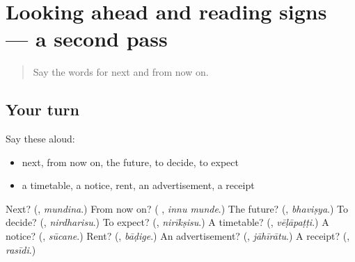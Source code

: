 \section[(dialogue)]{Looking ahead and reading signs — a second pass}

\label{lesson:KA-R157-second-pass-looking-ahead-and-reading-signs}



\begin{quote}
Say the words for next and from now on.
\end{quote}

\subsection*{Your turn}
Say these aloud:

\begin{itemize}
\raggedright
  \item next, from now on, the future, to decide, to expect
  \item a timetable, a notice, rent, an advertisement, a receipt
\end{itemize}

\begin{tcolorbox}[breakable,colback=teal!4,colframe=teal!35!black,title={Before you move on}]
Next? (\textbf{}, \emph{mundina}.) From now on? (\textbf{ }, \emph{innu munde}.) The future? (\textbf{}, \emph{bhaviṣya}.) To decide? (\textbf{}, \emph{nirdharisu}.) To expect? (\textbf{}, \emph{nirīkṣisu}.) A timetable? (\textbf{}, \emph{vēḷāpaṭṭi}.) A notice? (\textbf{}, \emph{sūcane}.) Rent? (\textbf{}, \emph{bāḍige}.) An advertisement? (\textbf{}, \emph{jāhīrātu}.) A receipt? (\textbf{}, \emph{rasīdi}.)
\end{tcolorbox}
